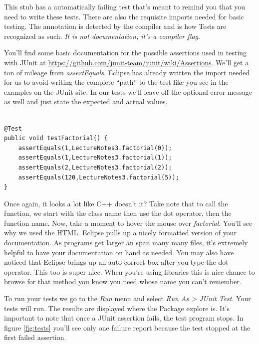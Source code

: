 \documentclass[]{tufte-handout}
\begin{document}
This stub has a automatically failing test that's meant to remind you that you need to write these tests. There are also the requisite imports needed for basic testing. The \@Test annotation is detected by the compiler and is how Tests are recognized as such. \textit{It is not documentation, it's a compiler flag}. 


You'll find some basic documentation for the possible assertions used in testing with JUnit at \url{https://github.com/junit-team/junit/wiki/Assertions}. We'll get a ton of mileage from \textit{assertEquals}. Eclipse has already written the import needed for us to avoid writing the complete ``path'' to the test like you see in the examples on the JUnit site. In our tests we'll leave off the optional error message as well and just state the expected and actual values. 

\begin{lstlisting}

@Test
public void testFactorial() {
	assertEquals(1,LectureNotes3.factorial(0));
	assertEquals(1,LectureNotes3.factorial(1));
	assertEquals(2,LectureNotes3.factorial(2));
	assertEquals(120,LectureNotes3.factorial(5));
}

\end{lstlisting}

Once again, it looks a lot like C++ doesn't it? Take note that to call the function, we start with the class name then use the dot operator, then the function name. Now, take a moment to hover the mouse over \textit{factorial}. You'll see why we used the HTML. Eclipse pulls up a nicely formatted version of your documentation. As programs get larger an span many many files, it's extremely helpful to have your documentation on hand as needed. You may also have noticed that Eclipse brings up an auto-correct box after you type the dot operator. This too is super nice. When you're using libraries this is nice chance to browse for that method you know you need whose name you can't remember. 

To run your tests we go to the \textit{Run} menu and select \textit{Run As > JUnit Test}. Your tests will run. 	The results are displayed where the Package explore is. It's important to note that once a JUnit assertion fails, the test program stops.  In figure \ref{fig:tests} you'll see only one failure report because the test stopped at the first failed assertion.
\end{document}
